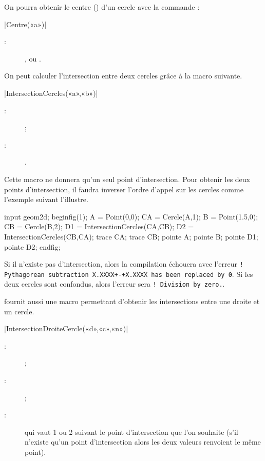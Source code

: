 \documentclass[a4paper,french]{article}
\begin{document}
On pourra obtenir le centre () d'un cercle avec la commande :
\begin{colourband}
\macro|Centre(«a»)|
\begin{description}
  \item[:]  ,  ou .
\end{description}
\end{colourband}
\bigskip

On peut calculer l'intersection entre deux cercles grâce à la macro suivante.

\begin{colourband}
\macro|IntersectionCercles(«a»,«b»)|
\begin{description}
  \item[:]   ;
  \item[:]  .
\end{description}
\end{colourband}
\bigskip

Cette macro ne donnera qu'un seul point d'intersection. Pour obtenir les deux
points d'intersection, il faudra inverser l'ordre d'appel sur les cercles comme
l'exemple suivant l'illustre.

\begin{ExempleMP}
input geom2d;
beginfig(1);
A = Point(0,0);
CA = Cercle(A,1);
B = Point(1.5,0);
CB = Cercle(B,2);
D1 = IntersectionCercles(CA,CB);
D2 = IntersectionCercles(CB,CA);
trace CA; trace CB;
pointe A; pointe B;  pointe D1; pointe D2;
endfig;
\end{ExempleMP}

Si il n'existe pas d'intersection, alors la compilation échouera avec l'erreur
\texttt{! Pythagorean subtraction X.XXXX+-+X.XXXX has been replaced by 0}. Si
les deux cercles sont confondus, alors l'erreur sera \texttt{! Division by zero.}.

\mpgeomdd fournit aussi une macro permettant d'obtenir les intersections entre une
droite et un cercle.

\begin{colourband}
\macro|IntersectionDroiteCercle(«d»,«c»,«n»)|
\begin{description}
  \item[:]   ;
  \item[:]   ;
  \item[:]  qui vaut 1 ou 2 suivant le point
  d'intersection que l'on souhaite (s'il n'existe qu'un point d'intersection
  alors les deux valeurs renvoient le même point).
\end{description}
\end{colourband}
\bigskip
\end{document}
